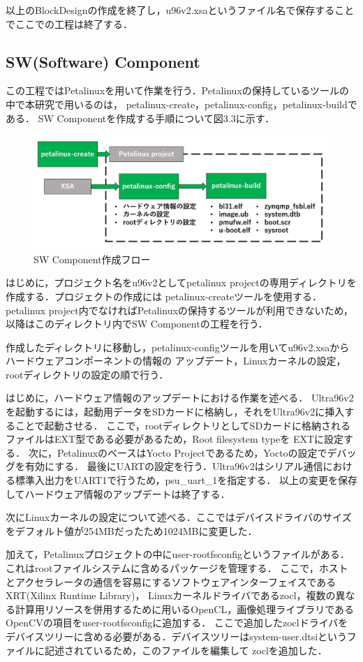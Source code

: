 \documentclass[11pt,a4j]{jreport}
\begin{document}
以上のBlockDesignの作成を終了し，u96v2.xsaというファイル名で保存することでここでの工程は終了する．

\subsection{SW(Software) Component}
この工程ではPetalinuxを用いて作業を行う．Petalinuxの保持しているツールの中で本研究で用いるのは，
petalinux-create，petalinux-config，petalinux-buildである．
SW Componentを作成する手順について図3.3に示す．
\begin{figure}[H]
  \center
  \includegraphics[scale = 0.8]{pict/pict9.jpg}
  \caption{SW Component作成フロー}
\end{figure}

はじめに，プロジェクト名をu96v2としてpetalinux projectの専用ディレクトリを作成する．プロジェクトの作成には
petalinux-createツールを使用する．petalinux project内でなければPetalinuxの保持するツールが利用できないため，
以降はこのディレクトリ内でSW Componentの工程を行う．

作成したディレクトリに移動し，petalinux-configツールを用いてu96v2.xsaからハードウェアコンポーネントの情報の
アップデート，Linuxカーネルの設定，rootディレクトリの設定の順で行う．

はじめに，ハードウェア情報のアップデートにおける作業を述べる．
Ultra96v2を起動するには，起動用データをSDカードに格納し，それをUltra96v2に挿入することで起動させる．
ここで，rootディレクトリとしてSDカードに格納されるファイルはEXT型である必要があるため，Root filesystem typeを
EXTに設定する．
次に，PetalinuxのベースはYocto Projectであるため，Yoctoの設定でデバッグを有効にする．
最後にUARTの設定を行う．Ultra96v2はシリアル通信における標準入出力をUART1で行うため，psu_uart_1を指定する．
以上の変更を保存してハードウェア情報のアップデートは終了する．

次にLinuxカーネルの設定について述べる．ここではデバイスドライバのサイズをデフォルト値が254MBだったため1024MBに変更した．

加えて，Petalinuxプロジェクトの中にuser-rootfsconfigというファイルがある．これはrootファイルシステムに含めるパッケージを管理する．
ここで，ホストとアクセラレータの通信を容易にするソフトウェアインターフェイスであるXRT(Xilinx Runtime Library)，
Linuxカーネルドライバであるzocl，複数の異なる計算用リソースを併用するために用いるOpenCL，画像処理ライブラリであるOpenCVの項目をuser-rootfsconfigに追加する．
ここで追加したzoclドライバをデバイスツリーに含める必要がある．デバイスツリーはsystem-user.dtsiというファイルに記述されているため，このファイルを編集して
zoclを追加した．
\end{document}
